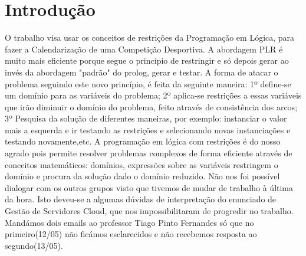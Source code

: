\documentclass[runningheads,a4paper]{llncs}
\begin{document}
\section{Introdução}
O trabalho visa usar os conceitos de restrições da Programação em Lógica, para fazer a Calendarização de uma Competição Desportiva. A abordagem PLR é muito mais eficiente porque segue o princípio de restringir e só depois gerar ao invés da abordagem "padrão" do prolog, gerar e testar. A forma de atacar o problema seguindo este novo princípio, é feita da seguinte maneira: 1º define-se um domínio para as variáveis do problema; 2º aplica-se restrições a essas variáveis que irão diminuir o domínio do problema, feito através de consistência dos arcos; 3º Pesquisa da solução de diferentes maneiras, por exemplo: instanciar o valor mais a esquerda e ir testando as restrições e selecionando novas instanciações e testando novamente,etc. A programação em lógica com restrições é do nosso agrado pois permite resolver problemas complexos de forma eficiente através de conceitos matemáticos: domínios, expressões sobre as variáveis restringem o domínio e procura da solução dado o domínio reduzido. Não nos foi possível dialogar com os outros grupos visto que tivemos de mudar de trabalho à última da hora. Isto deveu-se a algumas dúvidas de interpretação do enunciado de Gestão de Servidores Cloud, que nos impossibilitaram de progredir no trabalho. Mandámos dois emails ao professor Tiago Pinto Fernandes só que no primeiro(12/05) não ficámos esclarecidos e não recebemos resposta ao segundo(13/05).
\end{document}
